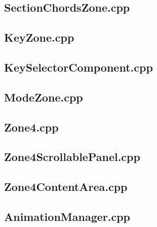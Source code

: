 \subsection{SectionChordsZone.cpp}


\subsection{KeyZone.cpp}


\subsection{KeySelectorComponent.cpp}


\subsection{ModeZone.cpp}


\subsection{Zone4.cpp}


\subsection{Zone4ScrollablePanel.cpp}


\subsection{Zone4ContentArea.cpp}


\subsection{AnimationManager.cpp}


